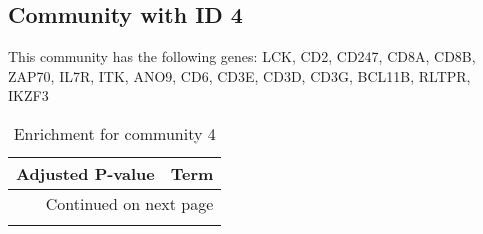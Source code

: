 \subsection*{Community with ID 4}
This community has the following genes: LCK, CD2, CD247, CD8A, CD8B, ZAP70, IL7R, ITK, ANO9, CD6, CD3E, CD3D, CD3G, BCL11B, RLTPR, IKZF3
\\
\begin{longtable}{p{2.4cm}p{14.5cm}}
\caption{Enrichment for community 4}\\
\toprule
Adjusted \newline P-value &                                                                                                                      Term \\
\midrule
\endhead
\midrule
\multicolumn{2}{r}{{Continued on next page}} \\
\midrule
\endfoot


\end{longtable}

